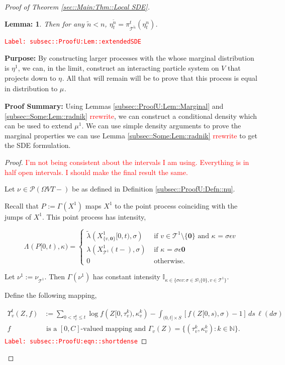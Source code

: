 \documentclass[12pt]{article}
\newcommand{\mb}{\mathbb}
\newcommand{\mc}{\mathcal}
\newcommand{\te}{\text}
\newcommand{\ep}{\epsilon}
\newcommand{\tr}{\textcolor{red}}
\newcommand{\labe}[1]{\tr{\texttt{Label: #1}}}
\newcommand{\purpose}{\textbf{Purpose: }}
\newcommand{\pfsum}{\textbf{Proof Summary: }}
\newcommand{\ind}{\hspace{24pt}}
\newcommand{\defeq}{:=}								%
\newcommand{\pmsr}{\mc{P}}							%
\renewcommand{\root}{\mathbf{0}}				%
\renewcommand{\v}{v}							%
\renewcommand{\S}{S}							%
\newcommand{\s}{\sigma}							%
\newcommand{\ev}{\ep}							%
\newcommand{\T}{T}								%
\renewcommand{\t}{t}							%
\newcommand{\pup}[1]{^{#1}}							%
\newcommand{\tree}{\mc{T}}							%
\newcommand{\V}{V}									%
\renewcommand{\tt}{s}								%
\newcommand{\rt}[1]{\tau^{#1}}						%
\renewcommand{\it}{k}								%
\newcommand{\numb}{n}								%
\newcommand{\piV}[2]{\pi_{#1}^{#2}}					%
\newcommand{\rxvtn}[3]{X_{#1}^{#3}(#2)}				%
\newcommand{\rxvtsn}[3]{X_{#1}^{#3}{#2}}			%
\newcommand{\rxvttts}[2]{Z_{#1}{#2}}				%
\newcommand{\rp}[1]{P^{#1}}							%
\newcommand{\m}[3]{\mu_{#2#1}^{#3}}						%
\newcommand{\mm}[3]{\nu_{#2#1}^{#3}}						%
\newcommand{\mmm}[3]{\eta_{#2#1}^{#3}}						%
\newcommand{\rate}[1]{\lambda_{#1}}					%
\newcommand{\ratee}[1]{\Lambda_{#1}}				%
\newcommand{\crate}[2]{\alt{\lambda}_{#1}^{#2}}		%
\newcommand{\const}[1]{C_{#1}}						%
\newcommand{\Sm}{\ell}								%
\newcommand{\alt}{\widetilde}						%
\renewcommand{\mark}[1]{\kappa^{#1}}				%
\newcommand{\ds}[2]{\Upsilon_{#1}^{#2}}			%
\newcommand{\pmap}[1]{\Gamma_{#1}}				%
\newtheorem{lem}[thms]{Lemma: }
\begin{document}
\begin{proof}[Proof of Theorem \ref{sec::Main:Thm::Local SDE}]
\begin{lem}
Then for any \(\alt{\numb} < \numb\), \(\mmm{}{\t}{\alt{\numb}} = \piV{\tree\pup{\alt{\numb}}}{\t}(\mmm{}{\t}{\numb})\).
\label{subsec::ProofU:Lem::extendedSDE}
\end{lem}
\labe{subsec::ProofU:Lem::extendedSDE}

\purpose By constructing larger processes with the whose marginal distribution is \(\mmm{}{}{1}\), we can, in the limit, construct an interacting particle system on \(V\) that projects down to \(\mmm{}{}{}\). All that will remain will be to prove that this process is equal in distribution to \(\m{}{}{}\).

\pfsum Using Lemmas \ref{subsec::ProofU:Lem::Marginal} and \ref{subsec::Some:Lem::radnik} \tr{rrewrite}, we can construct a conditional density which can be used to extend \(\mu\pup{1}\). We can use simple density arguments to prove the marginal properties we can use Lemma \ref{subsec::Some:Lem::radnik} \tr{rrewrite} to get the SDE formulation.

\begin{proof}
\tr{I'm not being consistent about the intervals I am using. Everything is in half open intervals. I should make the final result the same.}

Let \(\mm{}{}{} \in \pmsr(\Omega{\V}{\T-})\) be as defined in Definition \ref{subsec::ProofU:Defn::nu}.

\ind Recall that \(\rp{} \defeq \pmap{}(\rxvtsn{}{}{1})\) maps \(\rxvtsn{}{}{1}\) to the point process coinciding with the jumps of \(\rxvtsn{}{}{1}\). This point process has intensity,

\[\ratee{}(\rp{}[0,\t),\mark{}) = \begin{cases}
\crate{}{}(\rxvtsn{\{\v,\root\}}{[0,\t)}{1},\s) &\te{ if } \v\in \tree\pup{1}\setminus\{\root\}\te{ and } \mark{} = \s\ev{\v}\\
\rate{}(\rxvtn{\tree\pup{1}}{\t-}{1},\s) &\te{ if } \mark{} = \s\ev{\root}\\
0 &\te{ otherwise}.
\end{cases}\]

Let \(\mm{}{}{1} \defeq \mm{\tree\pup{1}}{}{}\). Then \(\pmap{}(\mm{}{}{1})\) has constant intensity \(\mb{I}_{\kappa \in\{\s\ev{\v}:\s\in\S\setminus\{0\},\v\in\tree\pup{1}\}}\). 

\ind Define the following mapping,

\begin{align}
\ds{\v}{\t}(\rxvttts{}{},f) &\defeq \sum_{0 < \rt{\it}_\v \leq \t} \log{f(\rxvttts{}{[0,\rt{\it}_\v)},\mark{\it}_\v)} - \int_{(0,\t]\times \S} [f(\rxvttts{}{[0,\tt)},\s) - 1]\,ds\,\Sm(d\s) \label{subsec::ProofU:eqn::shortdense}\\
f&\te{ is a }[0,\const{}] \te{-valued mapping and } \pmap{\v}(\rxvttts{}{}) = \{(\rt{\it}_\v,\mark{\it}_\v):\it\in\mb{N}\}.\nonumber
\end{align} 
\labe{subsec::ProofU:eqn::shortdense}


\end{proof}
\end{proof}
\end{document}
